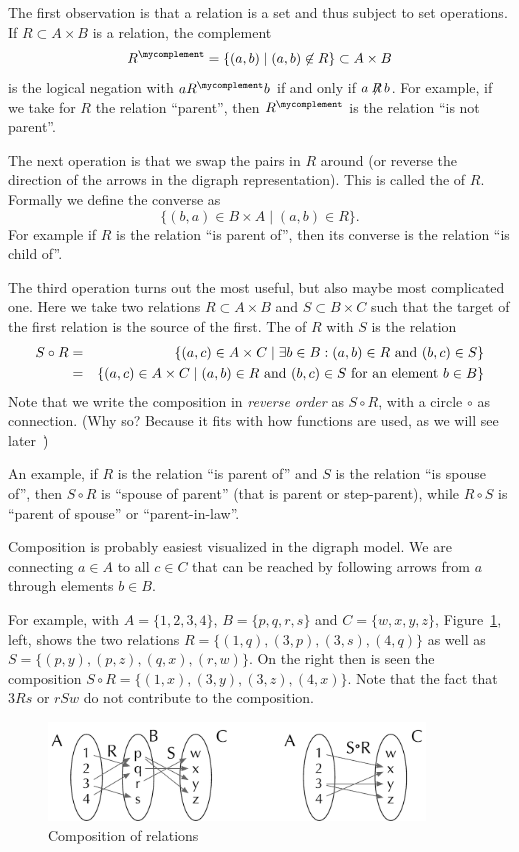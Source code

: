 The first observation is that a relation is a set and thus subject to set
operations. If $R\subset A\times B$ is a relation, the complement
\[
R^\mycomplement=\{(a,b)\mid (a,b)\not\in R\}\subset A\times B
\]
is the logical negation with $aR^\mycomplement b$ if and only if $a\not\!\!
R\, b$. For example,
if we take for $R$ the relation ``parent'', then $R^\mycomplement$ is the
relation ``is not parent''.
\medskip

The next operation is that we swap the pairs in $R$ around (or reverse the
direction of the arrows in the digraph representation). This is called the
 of $R$. Formally we define the converse as
\[
\{(b,a)\in B\times A\mid (a,b)\in R\}.
\]
For example if $R$ is the relation ``is parent of'', then its converse is
the relation ``is child of''.
\medskip

The third operation turns out the most useful, but also maybe most
complicated one. Here we take two relations $R\subset A\times B$ and
$S\subset B\times C$ such that the target of the first relation is the
source of the first. The  of $R$ with $S$ is the
relation 
\begin{eqnarray*}
S\circ R&=&\{(a,c)\in A\times C\mid \exists b\in B: (a,b)\in R\mbox{\ and\
}(b,c)\in S\}\\
&=&\{(a,c)\in A\times C\mid (a,b)\in R\mbox{\ and\ }(b,c)\in S
\mbox{\ for an element $b\in B$}\}
\end{eqnarray*}
Note that we write the composition in {\em reverse order} as $S\circ R$,
with a circle $\circ$ as connection. (Why so? Because it fits with how
functions are used, as we will see later~\pointer{secfunccomposition}\.)

An example, if $R$ is the relation ``is parent of'' and $S$ is the relation
``is spouse of'', then $S\circ R$ is ``spouse of parent'' (that is parent or
step-parent), while $R\circ S$ is ``parent of spouse'' or ``parent-in-law''.
\smallskip

Composition is probably easiest visualized in the digraph model. We are
connecting $a\in A$ to all $c\in C$ that can be reached by following arrows
from $a$ through elements $b\in B$.

For example, with $A=\{1,2,3,4\}$, $B=\{p,q,r,s\}$ and $C=\{w,x,y,z\}$,
Figure~\ref{figcompdig}, left, shows the two relations
$R=\{(1,q),(3,p),(3,s),(4,q)\}$ as well as $S=\{(p,y),(p,z),(q,x),(r,w)\}$. On the
right then is seen the composition $S\circ R=\{(1,x),(3,y),(3,z),(4,x)\}$.
Note that the fact that $3Rs$ or $rSw$ do not contribute to the composition.
\begin{figure}[t]
\begin{center}
\includegraphics[width=10cm]{pic/CompositionDigraph.pdf}
\end{center}
\caption{Composition of relations}
\label{figcompdig}
\end{figure}

